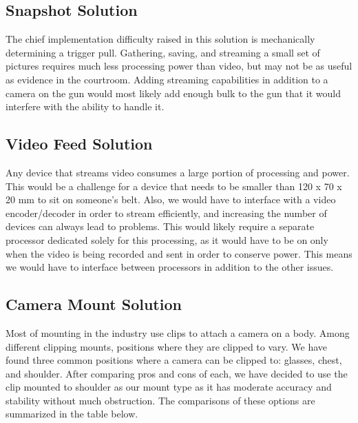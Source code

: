 \documentclass[12pt]{article}
\begin{document}
\subsection{Snapshot Solution}

The chief implementation difficulty raised in this solution is mechanically
determining a trigger pull. Gathering, saving, and streaming a small set of
pictures requires much less processing power than video, but may not be as useful
as evidence in the courtroom. Adding streaming capabilities in addition to a
camera on the gun would most likely add enough bulk to the gun that it would
interfere with the ability to handle it.

\subsection{Video Feed Solution}

Any device that streams video consumes a large portion of processing and power.
This would be a challenge for a device that needs to be smaller than 120 x 70 x
20 mm to sit on someone's belt. Also, we would have to interface with a video
encoder/decoder in order to stream efficiently, and increasing the number of
devices can always lead to problems. This would likely require a separate
processor dedicated solely for this processing, as it would have to be on only
when the video is being recorded and sent in order to conserve power. This
means we would have to interface between processors in addition to the other
issues.

\subsection{Camera Mount Solution}

Most of mounting in the industry use clips to attach a camera on a body. Among
different clipping mounts, positions where they are clipped to vary. We have
found three common positions where a camera can be clipped to: glasses, chest,
and shoulder. After comparing pros and cons of each, we have decided to use the
clip mounted to shoulder as our mount type as it has moderate accuracy and
stability without much obstruction. The comparisons of these options are
summarized in the table below.
\end{document}
